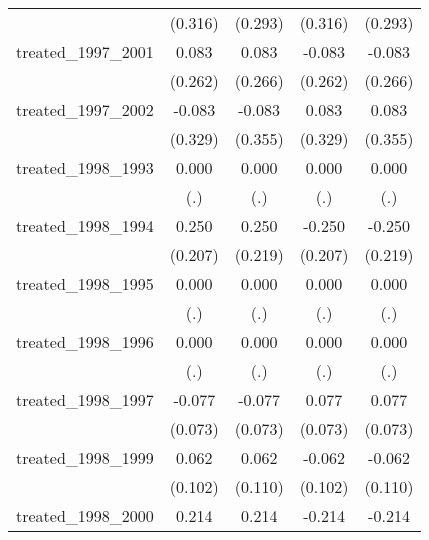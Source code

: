 {\begin{tabular}{l*{4}{c}}
            &     (0.316)         &     (0.293)         &     (0.316)         &     (0.293)         \\
[1em]
treated\_1997\_2001&       0.083         &       0.083         &      -0.083         &      -0.083         \\
            &     (0.262)         &     (0.266)         &     (0.262)         &     (0.266)         \\
[1em]
treated\_1997\_2002&      -0.083         &      -0.083         &       0.083         &       0.083         \\
            &     (0.329)         &     (0.355)         &     (0.329)         &     (0.355)         \\
[1em]
treated\_1998\_1993&       0.000         &       0.000         &       0.000         &       0.000         \\
            &         (.)         &         (.)         &         (.)         &         (.)         \\
[1em]
treated\_1998\_1994&       0.250         &       0.250         &      -0.250         &      -0.250         \\
            &     (0.207)         &     (0.219)         &     (0.207)         &     (0.219)         \\
[1em]
treated\_1998\_1995&       0.000         &       0.000         &       0.000         &       0.000         \\
            &         (.)         &         (.)         &         (.)         &         (.)         \\
[1em]
treated\_1998\_1996&       0.000         &       0.000         &       0.000         &       0.000         \\
            &         (.)         &         (.)         &         (.)         &         (.)         \\
[1em]
treated\_1998\_1997&      -0.077         &      -0.077         &       0.077         &       0.077         \\
            &     (0.073)         &     (0.073)         &     (0.073)         &     (0.073)         \\
[1em]
treated\_1998\_1999&       0.062         &       0.062         &      -0.062         &      -0.062         \\
            &     (0.102)         &     (0.110)         &     (0.102)         &     (0.110)         \\
[1em]
treated\_1998\_2000&       0.214         &       0.214         &      -0.214         &      -0.214         \\

\end{tabular}}
